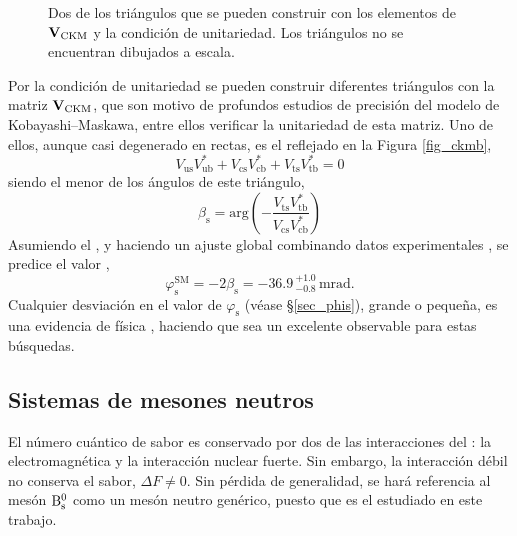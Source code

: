 \begin{figure}[H]
\centering
{} \hfill
{} \hfill
%
\caption{Dos de los triángulos que se pueden construir con los elementos de $\mathbf{V}_{\text{CKM}}$ y la condición de unitariedad. Los triángulos no se encuentran dibujados a escala.}	
\end{figure}


Por la condición de unitariedad se pueden construir diferentes triángulos con la matriz $\mathbf{V}_{\text{CKM}}$, que son motivo de profundos estudios de precisión del modelo de Kobayashi--Maskawa, entre ellos verificar la unitariedad de esta matriz. Uno de ellos, aunque casi degenerado en rectas, es el reflejado en la Figura \ref{fig_ckmb},
\begin{equation}
 V_{\mathrm{us}} V_{\mathrm{ub}}^* + V_{\mathrm{cs}} V_{\mathrm{cb}}^* + V_{\mathrm{ts}} V_{\mathrm{tb}}^* = 0 
\end{equation}
siendo el menor de los ángulos de este triángulo,
\begin{equation}
	\beta_{\mathrm{s}} =  \text{arg} \left( - \frac{V_{\mathrm{ts}} V_{\mathrm{tb}}^*}{V_{\mathrm{cs}} V_{\mathrm{cb}}^*}   \right)  \label{eq_bs_ckm}
\end{equation}
\color{vero} Asumiendo el \stdmod, y haciendo un ajuste global combinando datos experimentales \cite{ckmfitter1}, se predice el valor  , %
\begin{equation}
	\varphi_{\text{s}}^{\text{SM}} = -2 \beta_{\text{s}} = -36.9\,{}_{-0.8}^{+1.0} \, \text{mrad}. \label{eq_smpredicphis}
\end{equation} \color{norm}
\color{dieg} Cualquier desviación en el valor de $\varphi_{\text{s}}$ (véase \S\ref{sec_phis}), grande o pequeña, es una evidencia de física \bstdmod, haciendo que  sea un excelente observable para estas búsquedas. \color{norm}

\subsection{Sistemas de mesones neutros} %
\label{sec_neutralmesons}

El número cuántico de sabor es conservado por dos de las interacciones del \stdmod: la electromagnética y la interacción nuclear fuerte. Sin embargo, la interacción débil no conserva el sabor, $\Delta F \neq 0$. Sin pérdida de generalidad, se hará referencia al mesón $\mathrm{B}{}_{\mathrm{s}}^{0}$ como un mesón neutro genérico, puesto que es el \color{vero}estudiado \color{norm} en este trabajo. 

